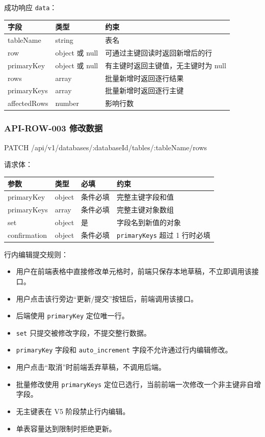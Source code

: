\documentclass[
  a4paper,
  UTF8]{ctexart}
\newenvironment{Shaded}{}{}
\newcommand{\NormalTok}[1]{#1}
\providecommand{\tightlist}{%
  \setlength{\itemsep}{0pt}\setlength{\parskip}{0pt}}
\begin{document}
成功响应 \texttt{data}：

\begin{longtable}[]{@{}lll@{}}
\toprule
字段 & 类型 & 约束 \\
\midrule
\endhead
tableName & string & 表名 \\
row & object 或 null & 可通过主键回读时返回新增后的行 \\
primaryKey & object 或 null & 有主键时返回主键值，无主键时为 null \\
rows & array & 批量新增时返回逐行结果 \\
primaryKeys & array & 批量新增时返回逐行主键 \\
affectedRows & number & 影响行数 \\
\bottomrule
\end{longtable}

\hypertarget{api-row-003-ux4feeux6539ux6570ux636e}{%
\subsubsection{API-ROW-003
修改数据}\label{api-row-003-ux4feeux6539ux6570ux636e}}

\begin{Shaded}
\begin{Highlighting}[]
\NormalTok{PATCH /api/v1/databases/:databaseId/tables/:tableName/rows}
\end{Highlighting}
\end{Shaded}

请求体：

\begin{longtable}[]{@{}llll@{}}
\toprule
参数 & 类型 & 必填 & 约束 \\
\midrule
\endhead
primaryKey & object & 条件必填 & 完整主键字段和值 \\
primaryKeys & array & 条件必填 & 完整主键对象数组 \\
set & object & 是 & 字段名到新值的对象 \\
confirmation & object & 条件必填 & \texttt{primaryKeys} 超过 1
行时必填 \\
\bottomrule
\end{longtable}

行内编辑提交规则：

\begin{itemize}
\tightlist
\item
  用户在前端表格中直接修改单元格时，前端只保存本地草稿，不立即调用该接口。
\item
  用户点击该行旁边``更新/提交''按钮后，前端调用该接口。
\item
  后端使用 \texttt{primaryKey} 定位唯一行。
\item
  \texttt{set} 只提交被修改字段，不提交整行数据。
\item
  \texttt{primaryKey} 字段和 \texttt{auto\_increment}
  字段不允许通过行内编辑修改。
\item
  用户点击``取消''时前端丢弃草稿，不调用后端。
\item
  批量修改使用 \texttt{primaryKeys}
  定位已选行，当前前端一次修改一个非主键非自增字段。
\item
  无主键表在 V5 阶段禁止行内编辑。
\item
  单表容量达到限制时拒绝更新。
\end{itemize}
\end{document}
